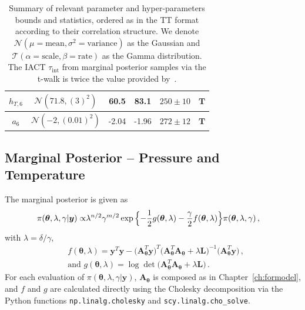 \begin{table}[ht!]
\begin{tabular}{ |c||c|c|c|c|c|   }
		$h_{T,6}$ &  $\mathcal{N}(71.8,(3)^2)$&60.5 &83.1&$250\pm 10$&$\bm{T}$\\ \hline
		$a_{6}$ & $\mathcal{N}(-2,(0.01)^2)$ &-2.04 &-1.96&$272\pm 12$&$\bm{T}$\\
		\hline
	\end{tabular}
	\caption[Summary of relevant parameter characteristics, bounds and sampling statistics.]{Summary of relevant parameter and hyper-parameters bounds and statistics, ordered as in the TT format according to their correlation structure. We denote $\mathcal{N}(\mu= \text{mean},\sigma^2= \text{variance})$ as the Gaussian and $\mathcal{T}(\alpha = \text{scale}, \beta = \text{rate})$ as the Gamma distribution. The IACT $\tau_{\text{int}}$ from marginal posterior samples via the t-walk is twice the value provided by~\cite{UwerrM, drikHesse}.}
	\label{tab:priors}
\end{table}
\clearpage

\subsection{Marginal Posterior -- Pressure and Temperature}
The marginal posterior is given as
\begin{align}
	\pi( \bm{\theta},\lambda,\gamma  | \bm{y}) \propto &  \lambda^{n/2} \gamma^{m/2}   \exp{ \Bigl\{ - \frac{1}{2} g ( \bm{\theta},\lambda) - \frac{\gamma}{2} f (\bm{\theta},\lambda) \Bigr\}} \pi(\bm{\theta},\lambda,\gamma ) \, ,
	\label{eq:MargPostFull}
\end{align}
with $\lambda= \delta / \gamma$,
\begin{subequations}
	\label{eq:fandgTrue}
	\begin{align}
		&f ( \bm{\theta},\lambda) = \bm{y}^T \bm{y} - \big(\bm{A}_{\bm{\theta}}^T \bm{y}\big)^T \big(\bm{A}_{\bm{\theta}}^T  \bm{A}_{\bm{\theta}} + \lambda \bm{L}\big)^{-1} \big(\bm{A}_{\bm{\theta}}^T \bm{y}\big)  \label{eq:fFullAppl} \, ,  \\
		&\text{and } g(\bm{\theta},\lambda) = \log \det \big(\bm{A}_{\bm{\theta}}^T  \bm{A}_{\bm{\theta}} + \lambda \bm{L}\big) \label{eq:gFullAppl} \, .
	\end{align}
\end{subequations}
For each evaluation of $\pi( \bm{\theta},\lambda,\gamma  | \bm{y})$, $\bm{A}_{\bm{\theta}}$ is composed as in Chapter~\ref{ch:formodel}, and $f$ and $g$ are calculated directly using the Cholesky decomposition via the Python functions \texttt{np.linalg.cholesky} and \texttt{scy.linalg.cho\_solve}.

